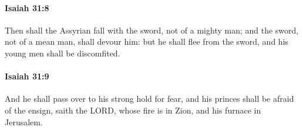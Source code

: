 		\paragraph{Isaiah 31:8} %
			\label{ISAIAH-31-8}

			Then shall the Assyrian fall with the sword, not of a mighty man; and the sword, not of a mean man, shall devour him: but he shall flee from the sword, and his young men shall be discomfited.


		\paragraph{Isaiah 31:9} %
			\label{ISAIAH-31-9}

			And he shall pass over to his strong hold for fear, and his princes shall be afraid of the ensign, saith the LORD, whose fire is in Zion, and his furnace in Jerusalem.

